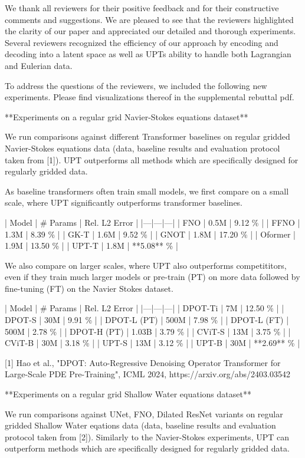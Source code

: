 We thank all reviewers for their positive feedback and for their constructive comments and suggestions.
We are pleased to see that the reviewers highlighted the clarity of our paper and appreciated our detailed and thorough experiments. Several reviewers recognized the efficiency of our approach by encoding and decoding into a latent space as well as UPTs ability to handle both Lagrangian and Eulerian data.



To address the questions of the reviewers, we included the following new experiments. Please find visualizations thereof in the supplemental rebuttal pdf.

**Experiments on a regular grid Navier-Stokes equations dataset**

We run comparisons against different Transformer baselines on regular gridded Navier-Stokes equations data (data, baseline results and evaluation protocol taken from [1]). UPT outperforms all methods which are specifically designed for regularly gridded data.

As baseline transformers often train small models, we first compare on a small scale, where UPT significantly outperforms transformer baselines.

| Model | # Params | Rel. L2 Error  |
|---|---|---|
| FNO | 0.5M | 9.12 \%  |
| FFNO | 1.3M | 8.39 \%  |
| GK-T |  1.6M | 9.52 \%  |
| GNOT |  1.8M | 17.20 \%  |
| Oformer | 1.9M |  13.50 \%  |
| UPT-T | 1.8M | **5.08** \%  |

We also compare on larger scales, where UPT also outperforms competititors, even if they train much larger models or pre-train (PT) on more data followed by fine-tuning (FT) on the Navier Stokes dataset.


| Model | # Params | Rel. L2 Error  |
|---|---|---|
| DPOT-Ti |  7M | 12.50 \%  |
| DPOT-S | 30M |  9.91 \%  |
| DPOT-L (PT) | 500M | 7.98 \%  |
| DPOT-L (FT) | 500M | 2.78 \%  |
| DPOT-H (PT) | 1.03B | 3.79 \%  |
| CViT-S | 13M | 3.75 \%  |
| CViT-B | 30M | 3.18 \%  |
| UPT-S | 13M | 3.12 \%  |
| UPT-B | 30M | **2.69** \%  |


[1] Hao et al., "DPOT: Auto-Regressive Denoising Operator Transformer for Large-Scale PDE Pre-Training", ICML 2024, https://arxiv.org/abs/2403.03542



**Experiments on a regular grid Shallow Water equations dataset**


We run comparisons against UNet, FNO, Dilated ResNet variants on regular gridded Shallow Water eqations data (data, baseline results and evaluation protocol taken from [2]). Similarly to the Navier-Stokes experiments, UPT can outperform methods which are specifically designed for regularly gridded data.


